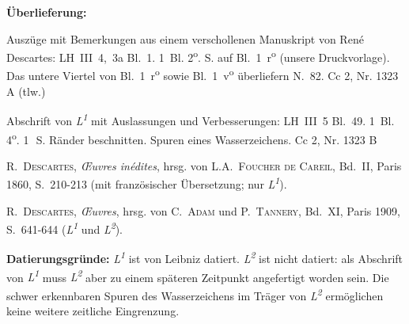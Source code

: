 \begin{ledgroupsized}[r]{120mm}%
\footnotesize%
\pstart%
\noindent\textbf{\"{U}berlieferung:}%
\pend%
\end{ledgroupsized}%
\begin{ledgroupsized}[r]{114mm}%
\footnotesize%
\pstart%
\parindent -6mm%
%
Auszüge mit Bemerkungen aus einem verschollenen Manuskript von René Descartes:
LH~III~4,~3a Bl.~1.
1~Bl. 2\textsuperscript{o}.  S. auf Bl.~1~r\textsuperscript{o}
(unsere Druckvorlage).
Das untere Viertel von Bl.~1~r\textsuperscript{o} sowie Bl.~1~v\textsuperscript{o} überliefern N.~82.%
\newline%
Cc 2, Nr. 1323 A (tlw.)
%
\pend%
\end{ledgroupsized}%
%
\begin{ledgroupsized}[r]{114mm}%
\footnotesize%
\pstart%
\parindent -6mm%
%
Abschrift von \textit{L\textsuperscript{1}} mit Auslassungen und Verbesserungen:
LH~III~5 Bl.~49.
1~Bl. 4\textsuperscript{o}. 1\,~S.
R\"{a}nder beschnitten.
Spuren eines Wasserzeichens.%
\newline%
Cc 2, Nr. 1323 B%
\pend%
\end{ledgroupsized}%
%
\begin{ledgroupsized}[r]{114mm}%
\footnotesize%
\pstart%
\parindent -6mm%
%
\cite{01121}\textsc{R.~Descartes}, \textit{{\OE}uvres in\'{e}dites}, hrsg. von \textsc{L.A.~Foucher de Careil}, Bd.~II, Paris 1860, S.~210-213 (mit franz\"{o}sischer \"{U}bersetzung; nur \textit{L\textsuperscript{1}}).
\pend%
\end{ledgroupsized}%
%
\begin{ledgroupsized}[r]{114mm}%
\footnotesize%
\pstart%
\parindent -6mm%
%
\cite{00120}\textsc{R.~Descartes}, \textit{{\OE}uvres}, hrsg. von \textsc{C.~Adam} und \textsc{P.~Tannery}, Bd.~XI, Paris 1909, S.~641-644 (\textit{L\textsuperscript{1}} und \textit{L\textsuperscript{2}}).%
\pend
\end{ledgroupsized}
%
%
\vspace*{5mm}%
\begin{ledgroup}%
\footnotesize%
\pstart%
\noindent%
\footnotesize{%
\textbf{Datierungsgr\"{u}nde:}
\textit{L\textsuperscript{1}} ist von Leibniz datiert.
\textit{L\textsuperscript{2}} ist nicht datiert:
als Abschrift von \textit{L\textsuperscript{1}} muss \textit{L\textsuperscript{2}} aber zu einem sp\"{a}teren Zeitpunkt angefertigt worden sein.
Die schwer erkennbaren Spuren des Wasserzeichens im Träger von \textit{L\textsuperscript{2}} ermöglichen keine weitere zeitliche Eingrenzung.}%
\pend%
\end{ledgroup}%
